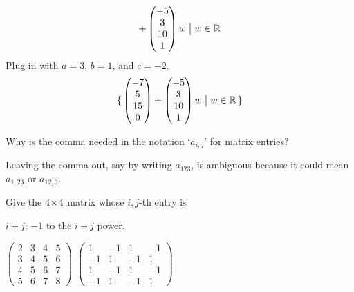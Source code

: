 \begin{exercises}
\begin{answer}
\begin{exparts}
\begin{equation*}
{                  +\begin{pmatrix} -5 \\ 3 \\ 10 \\ 1 \end{pmatrix}w
                  \bigm|w\in\mathbb{R}}
          \end{equation*}
        \partsitem Plug in with \( a=3 \), \( b=1 \), and \( c=-2 \).
          \begin{equation*}
             \mbox{$\{\,\begin{pmatrix} -7 \\ 5 \\ 15 \\ 0 \end{pmatrix}
                  +\begin{pmatrix} -5 \\ 3 \\ 10 \\ 1 \end{pmatrix}w
                  \bigm| w\in\mathbb{R}\,\}$}
          \end{equation*}
      \end{exparts}  
     \end{answer}
  \recommended \item 
    Why is the comma needed in the notation `\( a_{i,j} \)'
    for matrix entries?
    \begin{answer}
       Leaving the comma out, say by writing \( a_{123} \),
       is ambiguous because it could mean $a_{1,23}$ or $a_{12,3}$.  
    \end{answer}
  \recommended \item 
    Give the \( 4 \! \times \! 4 \) matrix whose
    \( i,j \)-th entry is
    \begin{exparts*}
      \partsitem \( i+j \);
      \partsitem \( -1 \) to the \( i+j \) power.
    \end{exparts*}
    \begin{answer}
      \begin{exparts*}
        \partsitem \(
           \begin{pmatrix}
             2  &3  &4  &5  \\
             3  &4  &5  &6  \\
             4  &5  &6  &7  \\
             5  &6  &7  &8
           \end{pmatrix} \)
        \partsitem \(
           \begin{pmatrix}
             1  &-1  &1   &-1  \\
            -1  &1   &-1  &1  \\
             1  &-1  &1   &-1  \\
            -1  &1   &-1  &1
           \end{pmatrix} \)

\end{exparts*}
\end{answer}
\end{exercises}
